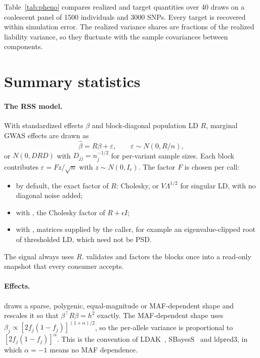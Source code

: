\documentclass[11pt,a4paper]{article}
\begin{document}
Table~\ref{tab:pheno} compares realized and target quantities over 40
draws on a coalescent panel of 1500 individuals and 3000 SNPs. Every
target is recovered within simulation error. The realized variance shares
are fractions of the realized liability variance, so they fluctuate with
the sample covariances between components.

\begin{table}[ht]\centering\small
\caption{Phenotype simulators: target versus realized. For
\texttt{simulate\_trait} the three numbers are the background, QTL and total
genetic shares of liability variance.}\label{tab:pheno}
\resizebox{\textwidth}{!}{}
\end{table}

\section{Summary statistics}
\paragraph{The RSS model.}
With standardized effects $\beta$ and block-diagonal population LD $R$,
marginal GWAS effects are drawn as~\cite{zhu2017}
\[
\hat\beta=R\beta+\varepsilon,\qquad\varepsilon\sim N(0,R/n),
\]
or $N(0,DRD)$ with $D_{jj}=n_j^{-1/2}$ for per-variant sample sizes. Each
block contributes $\varepsilon=Fz/\sqrt n$ with $z\sim N(0,I_r)$. The
factor $F$ is chosen per call:
\begin{itemize}
\item by default, the exact factor of $R$: Cholesky, or $V\Lambda^{1/2}$
  for singular LD, with no diagonal noise added;
\item with , the Cholesky factor of $R+\epsilon I$;
\item with , matrices supplied by the caller, for example an
  eigenvalue-clipped root of thresholded LD, which need not be PSD.
\end{itemize}
The signal always uses $R$.  validates and factors
the blocks once into a read-only snapshot that every consumer accepts.

\paragraph{Effects.}
 draws a sparse, polygenic, equal-magnitude or
MAF-dependent shape and rescales it so that $\beta^\top R\beta=h^2$
exactly. The MAF-dependent shape uses
$\beta_j\propto[2f_j(1-f_j)]^{(1+\alpha)/2}$, so the per-allele variance is
proportional to $[2f_j(1-f_j)]^{\alpha}$. This is the convention of
LDAK~\cite{speed2012}, SBayesS~\cite{zeng2018} and ldpred3, in which
$\alpha=-1$ means no MAF dependence.
\end{document}
